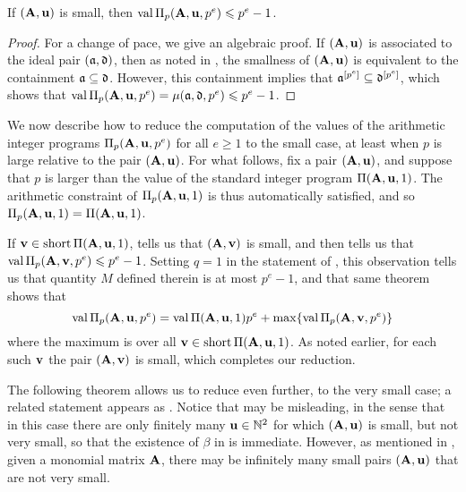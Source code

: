 \documentclass{amsart}
\begin{document}
\begin{proposition}
   \label{trivial small value bound: P}
   If $(\mathbf{A}, \mathbf{u})$ is small,  then $\operatorname{val} \Pi_p(\mathbf{A}, \mathbf{u}, p^e) \leqslant p^e-1$.
\end{proposition}

\begin{proof}
   For a change of pace, we give an algebraic proof.
   If $(\mathbf{A},\mathbf{u})$ is associated to the ideal pair $(\mathfrak{a}, \mathfrak{d})$, then as noted in , the smallness of $(\mathbf{A}, \mathbf{u})$ is equivalent to the containment $\mathfrak{a} \subseteq \mathfrak{d}$.
   However, this containment implies that $\mathfrak{a}^{[p^e]} \subseteq \mathfrak{d}^{[p^e]}$, which shows that $\operatorname{val} \Pi_p(\mathbf{A}, \mathbf{u}, p^e) = \mu(\mathfrak{a}, \mathfrak{d}, p^e) \leqslant p^e-1$.
\end{proof}

\begin{remark}
   We now describe how to reduce the computation of the values of the arithmetic integer programs $\Pi_p(\mathbf{A}, \mathbf{u}, p^e)$ for all $e \geq 1$ to the small case, at least when $p$ is large relative to the pair $(\mathbf{A}, \mathbf{u})$.
   For what follows, fix a pair $(\mathbf{A}, \mathbf{u})$, and suppose that $p$ is larger than the value of the standard integer program $\Pi(\mathbf{A}, \mathbf{u},1)$.
   The arithmetic constraint of $\Pi_p(\mathbf{A},\mathbf{u},1)$ is thus automatically satisfied, and so $\Pi_p(\mathbf{A}, \mathbf{u}, 1) = \Pi(\mathbf{A}, \mathbf{u}, 1)$.

   If $\mathbf{v} \in \operatorname{short} \Pi(\mathbf{A},\mathbf{u},1)$,  tells us that $(\mathbf{A}, \mathbf{v})$ is small, and   then tells us that $\operatorname{val} \Pi_p(\mathbf{A}, \mathbf{v}, p^e) \leqslant p^e-1$.
   Setting $q=1$ in the statement of , this observation tells us that quantity $M$ defined therein is at most $p^e-1$, and that same theorem shows that
   \[ \operatorname{val} \Pi_p(\mathbf{A}, \mathbf{u},p^e) = \operatorname{val} \Pi(\mathbf{A}, \mathbf{u},1)p^e + \max \{ \operatorname{val} \Pi_p(\mathbf{A}, \mathbf{v}, p^e) \}\]
   where the maximum is over all $\mathbf{v} \in \operatorname{short} \Pi(\mathbf{A}, \mathbf{u},1)$.
   As noted earlier, for each such $\mathbf{v}$ the pair $(\mathbf{A},\mathbf{v})$ is small, which completes our reduction.
\end{remark}

The following theorem allows us to reduce even further, to the very small case; a related statement appears as \cite[Theorem~6.4]{hernandez+etal.frobenius_powers}.
Notice that  may be misleading, in the sense that in this case there are only finitely many $\mathbf{u} \in \mathbb{N}^2$ for which $(\mathbf{A}, \mathbf{u})$ is small, but not very small, so that the existence of $\beta$ in  is immediate.
However, as mentioned in , given a monomial matrix $\mathbf{A}$, there may be infinitely many small pairs $(\mathbf{A}, \mathbf{u})$ that are not very small.
\end{document}
